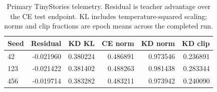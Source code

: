 \begin{table}[!t]\centering
\begin{tabular}{lrrrrr}
\toprule
Seed & Residual & KD KL & CE norm & KD norm & KD clip \\
\midrule
42 & -0.021960 & 0.380224 & 0.486891 & 0.973546 & 0.236891 \\
123 & -0.021422 & 0.381402 & 0.488263 & 0.981438 & 0.283344 \\
456 & -0.019714 & 0.383282 & 0.483211 & 0.973942 & 0.240090 \\
\bottomrule
\end{tabular}
\caption{Primary TinyStories telemetry. Residual is teacher advantage over the CE test endpoint. KL includes temperature-squared scaling; norms and clip fractions are epoch means across the completed run.}\label{tab:tinystories_optimization}
\end{table}
